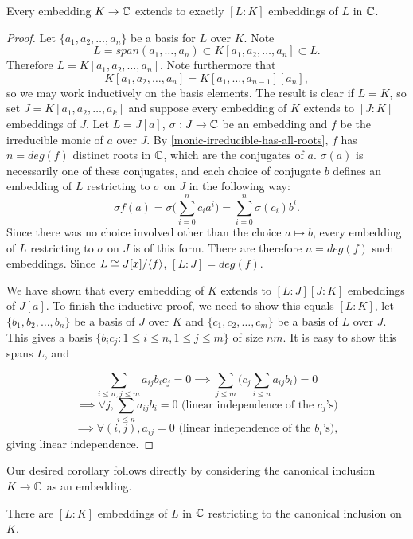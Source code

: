 \begin{proposition}\label{extend-to-[L:K]-embeddings}
Every embedding $K\rightarrow \mathbb{C}$ extends to exactly $[L:K]$ embeddings of $L$ in $\mathbb{C}$.
\end{proposition}
\begin{proof}
Let $\{a_1,a_2,\dots,a_n\}$ be a basis for $L$ over $K$. Note $$L=span(a_1,\dots,a_n)\subset K[a_1,a_2,\dots,a_n]\subset L.$$ Therefore $L= K[a_1,a_2,\dots,a_n].$ Note furthermore that $$K[a_1,a_2,\dots,a_n]=K[a_1,\dots,a_{n-1}][a_n],$$ so we may work inductively on the basis elements. The result is clear if $L=K$, so set $J=K[a_1,a_2,\dots,a_{k}]$ and suppose every embedding of $K$ extends to $[J:K]$ embeddings of $J$. Let $L=J[a]$, $\sigma:J\rightarrow \mathbb{C}$ be an embedding
and $f$ be the irreducible monic of $a$ over $J$. By \cref{monic-irreducible-has-all-roots}, $f$ has $n=deg(f)$ distinct roots in $\mathbb{C}$, which are the conjugates of $a.$ $\sigma(a)$ is necessarily one of these conjugates, and each choice of conjugate $b$ defines an embedding of $L$ restricting to $\sigma$ on $J$ in the following way:
$$\sigma f(a)=\sigma \big(\sum_{i=0}^n c_ia^i\big)=\sum_{i=0}^n \sigma(c_i) b^i.$$
Since there was no choice involved other than the choice $a\mapsto b$, every embedding of $L$ restricting to $\sigma$ on $J$ is of this form. There are therefore $n=deg(f)$ such embeddings. Since $L\cong J[x]/\langle f\rangle$, $[L:J]=deg(f)$. 

We have shown that every embedding of $K$ extends to $[L:J][J:K]$ embeddings of $J[a]$. To finish the inductive proof, we need to show this equals $[L:K]$, let $\{b_1,b_2,\dots,b_n\}$ be a basis of $J$ over $K$ and $\{c_1,c_2,\dots,c_m\}$ be a basis of $L$ over $J$. This gives a basis $\{b_ic_j:1\leq i \leq n, 1 \leq j\leq m\}$ of size $nm$. It is easy to show this spans $L$, and 

$$\sum_{i\leq n,j\leq m}a_{ij}b_ic_j=0\implies \sum_{j\leq m} \big(c_j \sum_{i\leq n}a_{ij}b_i\big)=0$$
$$\implies \forall j, \sum_{i\leq n} a_{ij}b_i=0 \text{ (linear independence of the } c_j \text{'s)}$$
$$\implies \forall (i,j), a_{ij}=0 \text{ (linear independence of the } b_i \text{'s)},$$
giving linear independence. 
\end{proof}

Our desired corollary follows directly by considering the canonical inclusion $K\rightarrow \mathbb{C}$ as an embedding.
\begin{corollary}
There are $[L:K]$ embeddings of $L$ in $\mathbb{C}$ restricting to the canonical inclusion on $K$.
\end{corollary}

